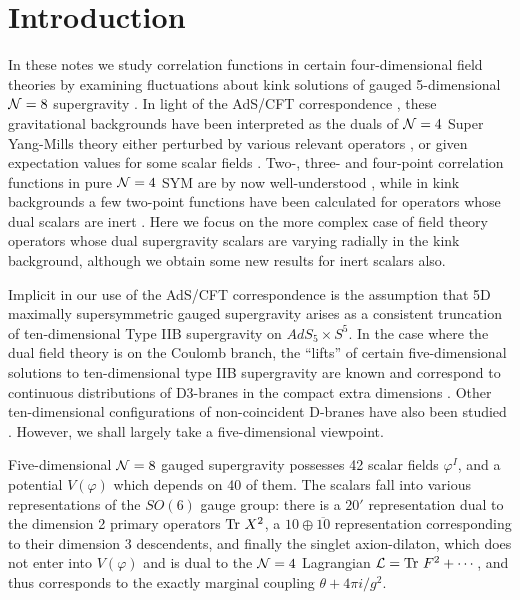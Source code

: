\documentclass[a4paper,12pt]{article}
\def\Tr{\rm Tr\ }
\begin{document}
\newpage
\section{Introduction}

In these notes we study correlation functions in certain
four-dimensional field theories by examining fluctuations about kink
solutions of gauged 5-dimensional ${\cal N}=8$ supergravity
\cite{GRW,PPvN}. In light of the AdS/CFT correspondence
\cite{juan,gkp,witten1}, these gravitational backgrounds have been
interpreted as the duals of ${\cal N}=4$ Super Yang-Mills theory
either perturbed by various relevant operators \cite{gppz1, dz1,
fgpw1, gppz, dz2}, or given expectation values for some scalar fields
\cite{fgpw2}.  Two-, three- and four-point correlation functions
in pure ${\cal N}=4$ SYM are by now well-understood \cite{gkp,
witten1, fmmr, dmmr}, while in kink backgrounds a few two-point
functions have been calculated for operators whose dual scalars are
inert \cite{fgpw2}.  Here we focus on the more complex case of field
theory operators whose dual supergravity scalars are varying radially
in the kink background, although we obtain some new results for inert
scalars also.

Implicit in our use of the AdS/CFT correspondence is the assumption
that 5D maximally supersymmetric gauged supergravity arises as a
consistent truncation of ten-dimensional Type IIB supergravity on
$AdS_5 \times S^5$.  In the case where the dual field theory is on the
Coulomb branch, the ``lifts'' of certain five-dimensional solutions to
ten-dimensional type IIB supergravity are known and correspond to
continuous distributions of D3-branes in the compact extra dimensions
\cite{fgpw2,bs}.  Other ten-dimensional configurations of non-coincident
D-branes have also been studied \cite{kw, cr, rv}. However, we shall
largely take a five-dimensional viewpoint.


Five-dimensional ${\cal N}=8$ gauged supergravity possesses 42 scalar
fields $\varphi^I$, and a potential $V(\varphi)$ which depends on
40 of them.  The scalars fall into various representations of the
$SO(6)$ gauge group: there is a $20'$ representation dual to the
dimension 2 primary operators ${\Tr} X^2$, a $10 \oplus \overline{10}$
representation corresponding to their dimension 3 descendents, and
finally the singlet axion-dilaton, which does not enter into
$V(\varphi)$ and is dual to the ${\cal N}=4$ Lagrangian ${\cal L} =
{\Tr} F^2 + \cdots$, and thus corresponds to the exactly marginal
coupling $\theta + 4\pi i/g^2$.
\end{document}
